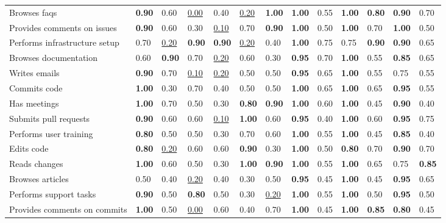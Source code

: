 \begin{tabular}{lllllllllllll}
Browses faqs & \textbf{0.90} & 0.60 & \underline{0.00} & 0.40 & \underline{0.20} & \textbf{1.00} & \textbf{1.00} & 0.55 & \textbf{1.00} & \textbf{0.80} & \textbf{0.90} & 0.70 \\
Provides comments on issues & \textbf{0.90} & 0.60 & 0.30 & \underline{0.10} & 0.70 & \textbf{0.90} & \textbf{1.00} & 0.50 & \textbf{1.00} & 0.70 & \textbf{1.00} & 0.50 \\
Performs infrastructure setup & 0.70 & \underline{0.20} & \textbf{0.90} & \textbf{0.90} & \underline{0.20} & 0.40 & \textbf{1.00} & 0.75 & 0.75 & \textbf{0.90} & \textbf{0.90} & 0.65 \\
Browses documentation & 0.60 & \textbf{0.90} & 0.70 & \underline{0.20} & 0.60 & 0.30 & \textbf{0.95} & 0.70 & \textbf{1.00} & 0.55 & \textbf{0.85} & 0.65 \\
Writes emails & \textbf{0.90} & 0.70 & \underline{0.10} & \underline{0.20} & 0.50 & 0.50 & \textbf{0.95} & 0.65 & \textbf{1.00} & 0.55 & 0.75 & 0.55 \\
Commits code & \textbf{1.00} & 0.30 & 0.70 & 0.40 & 0.50 & 0.50 & \textbf{1.00} & 0.65 & \textbf{1.00} & 0.65 & \textbf{0.95} & 0.55 \\
Has meetings & \textbf{1.00} & 0.70 & 0.50 & 0.30 & \textbf{0.80} & \textbf{0.90} & \textbf{1.00} & 0.60 & \textbf{1.00} & 0.45 & \textbf{0.90} & 0.40 \\
Submits pull requests & \textbf{0.90} & 0.60 & 0.60 & \underline{0.10} & \textbf{1.00} & 0.60 & \textbf{0.95} & 0.40 & \textbf{1.00} & 0.60 & \textbf{0.95} & 0.75 \\
Performs user training & \textbf{0.80} & 0.50 & 0.50 & 0.30 & 0.70 & 0.60 & \textbf{1.00} & 0.55 & \textbf{1.00} & 0.45 & \textbf{0.85} & 0.40 \\
Edits code & \textbf{0.80} & \underline{0.20} & 0.60 & 0.60 & \textbf{0.90} & 0.30 & \textbf{1.00} & 0.50 & \textbf{0.80} & 0.70 & \textbf{0.90} & 0.70 \\
Reads changes & \textbf{1.00} & 0.60 & 0.50 & 0.30 & \textbf{1.00} & \textbf{0.90} & \textbf{1.00} & 0.55 & \textbf{1.00} & 0.65 & 0.75 & \textbf{0.85} \\
Browses articles & 0.50 & 0.40 & \underline{0.20} & 0.40 & 0.30 & 0.50 & \textbf{0.95} & 0.45 & \textbf{1.00} & 0.45 & \textbf{0.95} & 0.65 \\
Performs support tasks & \textbf{0.90} & 0.50 & \textbf{0.80} & 0.50 & 0.30 & \underline{0.20} & \textbf{1.00} & 0.55 & \textbf{1.00} & 0.50 & \textbf{0.95} & 0.50 \\
Provides comments on commits & \textbf{1.00} & 0.50 & \underline{0.00} & 0.60 & 0.40 & 0.70 & \textbf{1.00} & 0.45 & \textbf{1.00} & \textbf{0.85} & \textbf{0.80} & 0.45 \\

\end{tabular}
